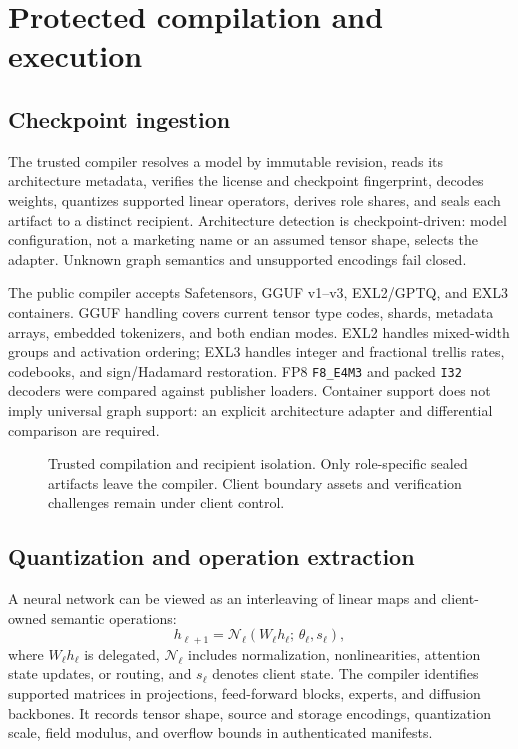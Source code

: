 \section{Protected compilation and execution}\label{sec:runtime}

\subsection{Checkpoint ingestion}

The trusted compiler resolves a model by immutable revision, reads its architecture metadata, verifies the license and checkpoint fingerprint, decodes weights, quantizes supported linear operators, derives role shares, and seals each artifact to a distinct recipient. Architecture detection is checkpoint-driven: model configuration, not a marketing name or an assumed tensor shape, selects the adapter. Unknown graph semantics and unsupported encodings fail closed.

The public compiler accepts Safetensors, GGUF v1--v3, EXL2/GPTQ, and EXL3 containers. GGUF handling covers current tensor type codes, shards, metadata arrays, embedded tokenizers, and both endian modes. EXL2 handles mixed-width groups and activation ordering; EXL3 handles integer and fractional trellis rates, codebooks, and sign/Hadamard restoration. FP8 \texttt{F8\_E4M3} and packed \texttt{I32} decoders were compared against publisher loaders. Container support does not imply universal graph support: an explicit architecture adapter and differential comparison are required.

\begin{figure}[htbp]
\centering

\caption{Trusted compilation and recipient isolation. Only role-specific sealed artifacts leave the compiler. Client boundary assets and verification challenges remain under client control.}
\label{fig:compiler}
\end{figure}

\subsection{Quantization and operation extraction}

A neural network can be viewed as an interleaving of linear maps and client-owned semantic operations:
\begin{equation}
h_{\ell+1}=\mathcal{N}_{\ell}\!\left(W_\ell h_\ell;\,\theta_\ell,s_\ell\right),
\end{equation}
where $W_\ell h_\ell$ is delegated, $\mathcal{N}_\ell$ includes normalization, nonlinearities, attention state updates, or routing, and $s_\ell$ denotes client state. The compiler identifies supported matrices in projections, feed-forward blocks, experts, and diffusion backbones. It records tensor shape, source and storage encodings, quantization scale, field modulus, and overflow bounds in authenticated manifests.

